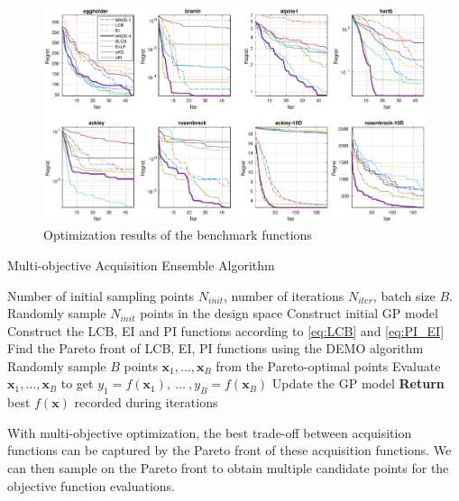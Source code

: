 \begin{figure}[!htb]
    \begin{center}
        \centerline{\includegraphics[width=1.0\linewidth]{./img/convplot.eps}}
        \caption{Optimization results of the benchmark functions}
        \label{fig:CovPlotBenchmark}
    \end{center}
    \vskip -0.15in
\end{figure}

\begin{algorithm}[!htb]
    \caption{Multi-objective Acquisition Ensemble Algorithm}
    \label{alg:MACE}
    \begin{algorithmic}[1]
        \REQUIRE Number of initial sampling points $N_{init}$, number of iterations $N_{iter}$, batch size $B$.
        \STATE Randomly sample $N_{init}$ points in the design space
        \STATE Construct initial GP model
        \STATE Construct the LCB, EI and PI functions according to \eqref{eq:LCB} and \eqref{eq:PI_EI}
        \STATE Find the Pareto front of LCB, EI, PI functions using the DEMO algorithm
        \STATE Randomly sample $B$ points $\bm{x}_1, \dots, \bm{x}_B$ from the Pareto-optimal points
        \STATE Evaluate $\bm{x}_1, \dots, \bm{x}_B$ to get $y_1 = f(\bm{x}_1),~\dots~,y_B = f(\bm{x}_B)$
        \STATE Update the GP model
        \ENDFOR
        \STATE \textbf{Return} best $f(\bm{x})$ recorded during iterations
    \end{algorithmic}
\end{algorithm}


With multi-objective optimization, the best trade-off between acquisition functions can be captured by the Pareto front of these acquisition functions. We can then sample on the Pareto front to obtain multiple candidate points for the objective function evaluations.


